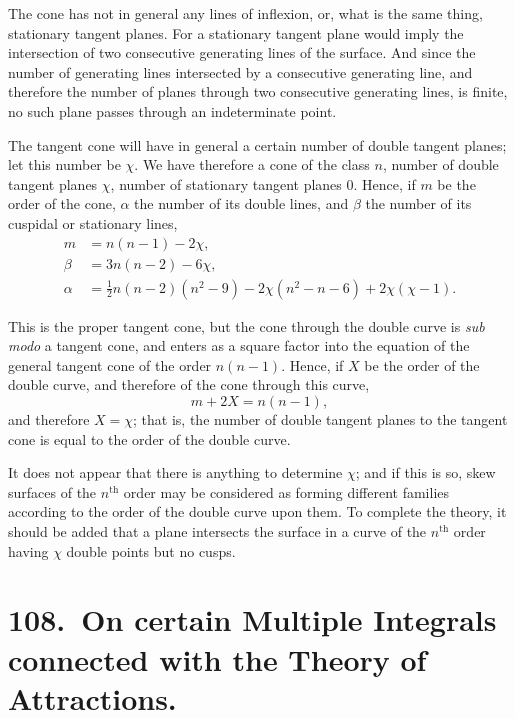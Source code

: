\documentclass[11pt,a4paper]{article}
\theoremstyle{plain}
\begin{document}
The cone has not in general any lines of inflexion, or, what is the same thing, stationary tangent planes. For a stationary tangent plane would imply the intersection of two consecutive generating lines of the surface. And since the number of generating lines intersected by a consecutive generating line, and therefore the number of planes through two consecutive generating lines, is finite, no such plane passes through an indeterminate point.

The tangent cone will have in general a certain number of double tangent planes; let this number be $\chi$. We have therefore a cone of the class $n$, number of double tangent planes $\chi$, number of stationary tangent planes $0$. Hence, if $m$ be the order of the cone, $\alpha$ the number of its double lines, and $\beta$ the number of its cuspidal or stationary lines,
\begin{align*}
m &= n(n-1) - 2\chi, \\
\beta &= 3n(n-2) - 6\chi, \\
\alpha &= \tfrac{1}{2}n(n-2)(n^2-9) - 2\chi(n^2-n-6) + 2\chi(\chi-1).
\end{align*}

This is the proper tangent cone, but the cone through the double curve is \emph{sub modo} a tangent cone, and enters as a square factor into the equation of the general tangent cone of the order $n(n-1)$. Hence, if $X$ be the order of the double curve, and therefore of the cone through this curve,
\[m + 2X = n(n-1),\]
and therefore $X = \chi$; that is, the number of double tangent planes to the tangent cone is equal to the order of the double curve.

It does not appear that there is anything to determine $\chi$; and if this is so, skew surfaces of the $n^{\text{th}}$ order may be considered as forming different families according to the order of the double curve upon them. To complete the theory, it should be added that a plane intersects the surface in a curve of the $n^{\text{th}}$ order having $\chi$ double points but no cusps.
\clearpage


\section*{108.\ On certain Multiple Integrals connected with the Theory of Attractions.}
\end{document}
